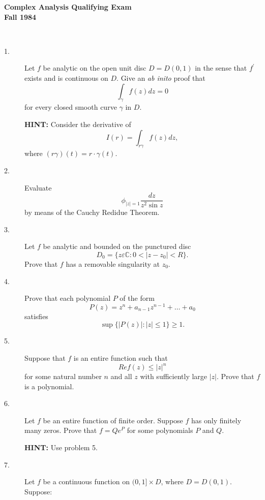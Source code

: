\documentclass{article}
\def\C{\mathbb C}
\begin{document}






\begin{center}\begin{LARGE}
{\bf Complex Analysis Qualifying Exam}\\ 
{\bf Fall 1984}\\ \end{LARGE}
\end{center}
\vspace{0.1in}
\noindent\hrulefill\\

\begin{description}
\item[1.]
Let $f$ be analytic on the open unit disc $D=D(0,1)$ in the sense that
$f^\prime$ exists and is continuous on $D$. Give an {\it ab inito}
proof that
$$\int_\gamma f(z) dz = 0$$
for every closed smooth curve $\gamma$ in $D$.

{\bf HINT:} Consider the derivative of
$$I(r) = \int_{r \gamma} f(z) dz,$$
where $(r\gamma) (t) = r \cdot \gamma (t)$.

\item[2.]
Evaluate
$$\phi_{|z| = 1} \frac{dz}{z^2 \sin z}$$
by means of the Cauchy Redidue Theorem.

\item[3.]
Let $f$ be analytic and bounded on the punctured disc
$$D_0 = \{z \varepsilon \C :0 < |z-z_0| < R\}.$$
Prove that $f$ has a removable singularity at $z_0$.

\item[4.]
Prove that each polynomial $P$ of the form
$$P(z) = z^n + a_{n-1} z^{n-1} + \dots + a_0$$
satisfies
$$\sup \{|P(z)| : |z| \leq 1\} \geq 1.$$

\item[5.]
Suppose that $f$ is an entire function such that
$$Re f(z) \leq |z|^n$$
for some natural number $n$ and all $z$ with sufficiently large $|z|$.
Prove that $f$ is a polynomial.

\item[6.]
Let $f$ be an entire function of finite order. Suppose $f$ has only
finitely many zeros. Prove that $f = Qe^P$ for some polynomials $P$ and $Q$.

{\bf HINT:} Use problem 5.

\item[7.]
Let $f$ be a continuous function on $(0,1] \times D$, where $D = D(0,1)$.
Suppose:


\end{description}
\end{document}

